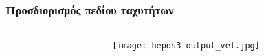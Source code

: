 \begin{frame}
  \frametitle{Προσδιορισμός πεδίου ταχυτήτων}
  \framesubtitle{}
  \label{}
  \vskip-1cm
  \begin{columns}[T]
    \begin{column}{.5\textwidth}
  
    \end{column}
    \begin{column}{.5\textwidth}
      \begin{center}
             \texttt{[image: hepos3-output\_vel.jpg]}
           \end{center}     
    \end{column}
  \end{columns}
\end{frame}
\note{}

